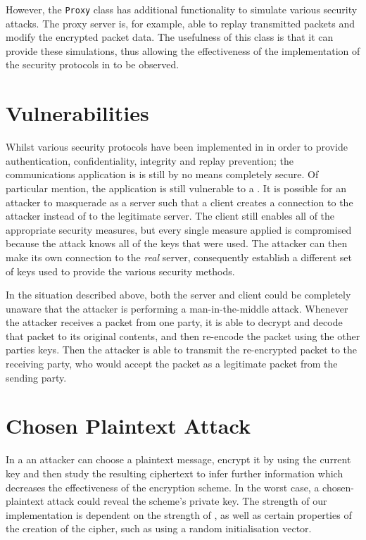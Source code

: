 \documentclass[a4paper,11pt]{article}
\begin{document}
However, the \verb+Proxy+ class has additional functionality to simulate 
various security attacks. The proxy server is, for example, able to replay 
transmitted packets and modify the encrypted packet data. The usefulness of this
class is that it can provide these simulations, thus allowing the effectiveness
of the implementation of the security protocols in \serviceName{} to be 
observed.

\section{Vulnerabilities}
Whilst various security protocols have been implemented in \serviceName{} in 
order to provide authentication, confidentiality, integrity and replay 
prevention; the communications application is is still by no means completely
secure. Of particular mention, the application is still vulnerable to a 
. It is possible for an attacker to 
masquerade as a \serviceName{} server such that a client creates a connection to
the attacker instead of to the legitimate server. The client still enables all 
of the appropriate security measures, but every single measure applied is 
compromised because the attack knows all of the keys that were used. The 
attacker can then make its own connection to the \emph{real} \serviceName{} 
server, consequently establish a different set of keys used to provide the 
various security methods.

In the situation described above, both the server and client could be 
completely unaware that the attacker is performing a man-in-the-middle attack. 
Whenever the attacker receives a packet from one party, it is able to decrypt 
and decode that packet to its original contents, and then re-encode the packet 
using the other parties keys. Then the attacker is able to transmit the 
re-encrypted packet to the receiving party, who would accept the packet as a
legitimate packet from the sending party.

\section{Chosen Plaintext Attack}
In a  an attacker can choose a plaintext 
message, encrypt it by using the current key and then study the resulting 
ciphertext to infer further information which decreases the effectiveness of the 
encryption scheme. In the worst case, a chosen-plaintext attack could reveal the
scheme's private key. The strength of our \packageName{} implementation is 
dependent on the strength of , as well as certain 
properties of the creation of the  cipher, such as using a 
random initialisation vector.
\end{document}
